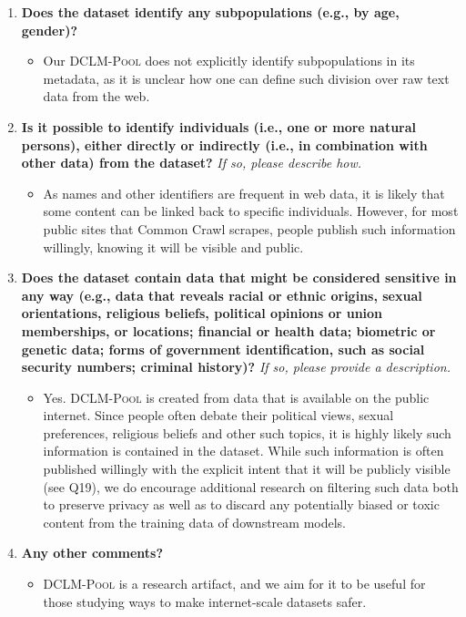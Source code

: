 \documentclass{article}
\newcommand{\rawpool}{\textsc{DCLM-Pool}\xspace}
\newcommand{\commoncrawl}{Common Crawl\xspace}
\begin{document}
\begin{enumerate}[label=Q\arabic*, resume]
\item \textbf{Does the dataset identify any subpopulations (e.g., by age, gender)?}

\begin{itemize}
\item Our \rawpool does not explicitly identify subpopulations in its metadata, as it is unclear how one can define such division over raw text data from the web.
\end{itemize}

\item \textbf{Is it possible to identify individuals (i.e., one or more natural persons), either directly or indirectly (i.e., in combination with other data) from the dataset?} \textit{If so, please describe how.}

\begin{itemize}
\item As names and other identifiers are frequent in web data, it is likely that some content can be linked back to specific individuals. However, for most public sites that \commoncrawl scrapes, people publish such information willingly, knowing it will be visible and public.
\end{itemize}

\item \textbf{Does the dataset contain data that might be considered sensitive in any way (e.g., data that reveals racial or ethnic origins, sexual orientations, religious beliefs, political opinions or union memberships, or locations; financial or health data; biometric or genetic data; forms of government identification, such as social security numbers; criminal history)?} \textit{If so, please provide a description.}

\begin{itemize}
\item Yes. \rawpool is created from data that is available on the public internet. Since people often debate their political views, sexual preferences, religious beliefs and other such topics, it is highly likely such information is contained in the dataset. While such information is often published willingly with the explicit intent that it will be publicly visible (see Q19), we do encourage additional research on filtering such data both to preserve privacy as well as to discard any potentially biased or toxic content from the training data of downstream models.
\end{itemize}

\item \textbf{Any other comments?}

\begin{itemize}
\item \rawpool is a research artifact, and we aim for it to be useful for those studying ways to make internet-scale datasets safer.
\end{itemize}

\end{enumerate}
\end{document}
